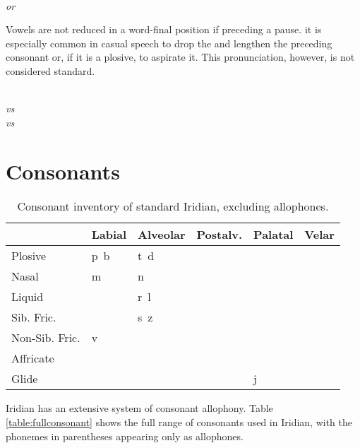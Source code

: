 \ex
	\\
	 \emph{or} 
\xe

Vowels are not reduced in a word-final position if preceding a pause.  it is especially common in casual speech to drop the  and lengthen the preceding consonant or, if it is a plosive, to aspirate it. This pronunciation, however, is not considered standard.

\pex
	\a
	\\
	 \emph{vs} 
	\a
	\\
	 \emph{vs} 
\xe




\section{Consonants}

\begin{table}[h!]
	\centering \footnotesize
	\caption{Consonant inventory of standard Iridian, excluding allophones.}
	\begin{tabu} to \textwidth{Y[2]MMMMM}
		\toprule
		& Labial	& Alveolar	& Postalv.	& Palatal	& Velar	\\
		\midrule
		Plosive & p~b		& t~d	&		& 	&  \\
		Nasal	& m				& n		&		& 	& 		\\
		Liquid	&				& r~l		&		&		&	\\
		Sib. Fric.& 			&s~z	& &  &\\
		Non-Sib. Fric.& 		v	&	&  &  &\\
		Affricate &				& 	&  &  &  \\

		Glide &  & &&j&\\
		\bottomrule
	\end{tabu}
\end{table}

Iridian has an extensive system of consonant allophony. Table \ref{table:fullconsonant} shows the full range of consonants used in Iridian, with the phonemes in parentheses appearing only as allophones.

